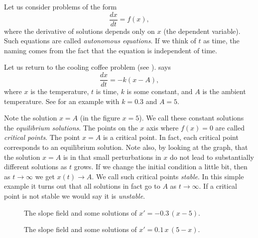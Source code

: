 \documentclass[12pt]{book}
\begin{document}

Let us consider
problems of the form
\begin{equation*}
\frac{dx}{dt} = f(x) ,
\end{equation*}
where the derivative of solutions depends only on $x$ (the dependent
variable).  Such equations are called \emph{autonomous
equations}.  If we think
of $t$ as time, the naming comes from the fact that the equation is
independent of time.

Let us return to the cooling coffee problem
(see ).
says
\begin{equation*}
\frac{dx}{dt} = -k (x-A) ,
\end{equation*}
where $x$ is the temperature, $t$ is time, $k$ is some constant, and $A$ is
the ambient temperature.  See  for an example
with $k=0.3$ and $A=5$.

Note the solution $x=A$ (in the figure $x=5$).
We call these constant solutions the
\emph{equilibrium solutions}.
The points on the $x$ axis where $f(x) = 0$ are called
\emph{critical points}.  The point
$x=A$ is a critical point.  In fact, each
critical point corresponds to an equilibrium solution.
Note also, by looking at the graph, that the solution $x=A$ is
 in
that small perturbations in $x$ do not lead to substantially different
solutions as $t$ grows.
If we change the initial condition a little bit, then as 
$t \to \infty$ we get $x(t) \to A$.  We call such critical points
\emph{stable}.
In this simple example it turns out that all solutions in fact go to $A$
as $t \to \infty$.  If a critical point is not stable we would say it is
\emph{unstable}.

\begin{figure}[h!t]
\begin{center}
\parbox[t]{3.1in}{
 \capstart
 \caption{The slope field and some solutions of
 $x' = -0.3\,(x-5)$.\label{2.2:coffeefig}}
}
\quad
\parbox[t]{3.1in}{
 \capstart
 \caption{The slope field and some solutions of
 $x' = 0.1\,x\,(5-x)$.\label{2.2:logisticfig}}
}
\end{center}
\end{figure}
\end{document}
